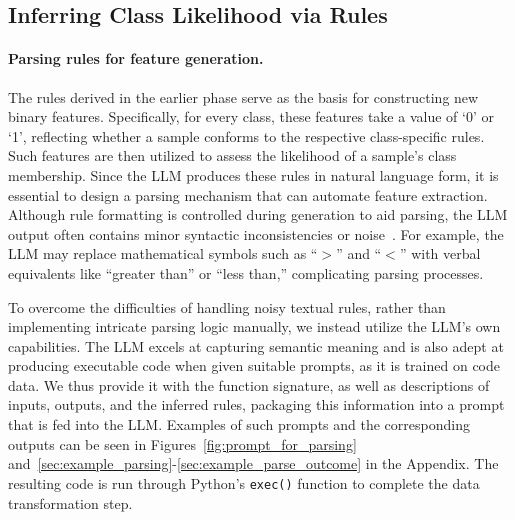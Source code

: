 \subsection{Inferring Class Likelihood via Rules}
\label{Sec:training}

\paragraph{Parsing rules for feature generation.} The rules derived in the earlier phase serve as the basis for constructing new binary features. Specifically, for every class, these features take a value of ‘0’ or ‘1’, reflecting whether a sample conforms to the respective class-specific rules. Such features are then utilized to assess the likelihood of a sample’s class membership. Since the LLM produces these rules in natural language form, it is essential to design a parsing mechanism that can automate feature extraction. Although rule formatting is controlled during generation to aid parsing, the LLM output often contains minor syntactic inconsistencies or noise~\cite{kovavc2023large}. For example, the LLM may replace mathematical symbols such as ``$>$'' and ``$<$'' with verbal equivalents like ``greater than'' or ``less than,'' complicating parsing processes. 

To overcome the difficulties of handling noisy textual rules, rather than implementing intricate parsing logic manually, we instead utilize the LLM’s own capabilities. The LLM excels at capturing semantic meaning and is also adept at producing executable code when given suitable prompts, as it is trained on code data. We thus provide it with the function signature, as well as descriptions of inputs, outputs, and the inferred rules, packaging this information into a prompt that is fed into the LLM. Examples of such prompts and the corresponding outputs can be seen in Figures~\ref{fig:prompt_for_parsing} and~\ref{sec:example_parsing}-\ref{sec:example_parse_outcome} in the Appendix. The resulting code is run through Python’s \texttt{exec()} function to complete the data transformation step.

\vspace*{-0.12in}
